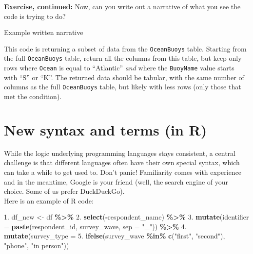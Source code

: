 \documentclass[
]{book}
\newenvironment{Shaded}{\begin{snugshade}}{\end{snugshade}}
\newcommand{\AttributeTok}[1]{\textcolor[rgb]{0.13,0.29,0.53}{#1}}
\newcommand{\FloatTok}[1]{\textcolor[rgb]{0.00,0.00,0.81}{#1}}
\newcommand{\FunctionTok}[1]{\textcolor[rgb]{0.13,0.29,0.53}{\textbf{#1}}}
\newcommand{\NormalTok}[1]{#1}
\newcommand{\OtherTok}[1]{\textcolor[rgb]{0.56,0.35,0.01}{#1}}
\newcommand{\SpecialCharTok}[1]{\textcolor[rgb]{0.81,0.36,0.00}{\textbf{#1}}}
\newcommand{\StringTok}[1]{\textcolor[rgb]{0.31,0.60,0.02}{#1}}
\begin{document}
\hfill\break

\textbf{Exercise, continued:} Now, can you write out a narrative of what you see the code is trying to do?

Example written narrative

This code is returning a subset of data from the \texttt{OceanBuoys} table. Starting from the full \texttt{OceanBuoys} table, return all the columns from this table, but keep only rows where \texttt{Ocean} is equal to ``Atlantic'' \emph{and} where the \texttt{BuoyName} value starts with ``S'' or ``K''. The returned data should be tabular, with the same number of columns as the full \texttt{OceanBuoys} table, but likely with less rows (only those that met the condition).

\hfill\break

\section{New syntax and terms (in R)}\label{new-syntax-and-terms-in-r-1}

While the logic underlying programming languages stays consistent, a central challenge is that different languages often have their own special syntax, which can take a while to get used to. Don't panic! Familiarity comes with experience and in the meantime, Google is your friend (well, the search engine of your choice. Some of us prefer DuckDuckGo).\\

Here is an example of R code:

\begin{Shaded}
\begin{Highlighting}[]
\FloatTok{1.}\NormalTok{  df\_new }\OtherTok{\textless{}{-}}\NormalTok{ df }\SpecialCharTok{\%\textgreater{}\%} 
\FloatTok{2.}    \FunctionTok{select}\NormalTok{(}\SpecialCharTok{{-}}\NormalTok{respondent\_name) }\SpecialCharTok{\%\textgreater{}\%} 
\FloatTok{3.}    \FunctionTok{mutate}\NormalTok{(}\AttributeTok{identifier =} \FunctionTok{paste}\NormalTok{(respondent\_id, survey\_wave, }\AttributeTok{sep =} \StringTok{"\_"}\NormalTok{)) }\SpecialCharTok{\%\textgreater{}\%} 
\FloatTok{4.}    \FunctionTok{mutate}\NormalTok{(}\AttributeTok{survey\_type =} 
\FloatTok{5.}           \FunctionTok{ifelse}\NormalTok{(survey\_wave }\SpecialCharTok{\%in\%} \FunctionTok{c}\NormalTok{(}\StringTok{"first"}\NormalTok{, }\StringTok{"second"}\NormalTok{), }\StringTok{"phone"}\NormalTok{, }\StringTok{"in person"}\NormalTok{))}
  
\end{Highlighting}
\end{Shaded}
\end{document}
